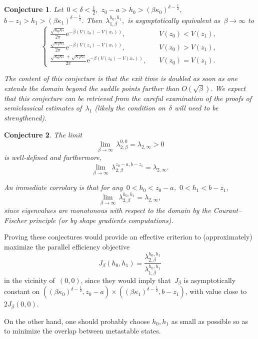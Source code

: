 \documentclass{article}
\newcommand{\e}{\mathrm{e}}
\newtheorem{conjecture}{Conjecture}
\begin{document}
    \begin{conjecture}\label{conj:lambda1}
        Let~$0<\delta<\frac12$,~$ z_0-a > h_0 > (\beta\kappa_0)^{\delta-\frac12}$,~$b-z_1>h_1>(\beta\kappa_1)^{\delta-\frac12}$.
         Then~$\lambda_{1,\beta}^{h_0,h_1},$ is asymptotically equivalent as~$\beta\to\infty$ to
        \begin{equation}
            \left\{
                \begin{aligned}
                    \frac{\sqrt{\kappa_0\kappa_*}}{2\pi}\e^{-\beta(V(z_0)-V(x_*))},&\quad V(z_0) < V(z_1),\\
                    \frac{\sqrt{\kappa_1\kappa_*}}{2\pi}\e^{-\beta(V(z_1)-V(x_*))},&\quad V(z_0) > V(z_1),\\
                    \frac{\sqrt{\kappa_0\kappa_*}+\sqrt{\kappa_1\kappa_*}}{2\pi}\e^{-\beta(V(z_0)-V(x_*))},& \quad V(z_0) = V(z_1).
                \end{aligned}
            \right.
        \end{equation}
    
    The content of this conjecture is that the exit time is doubled as soon as one extends the domain beyond the saddle points further than $O(\sqrt \beta)$. 
    We expect that this conjecture can be retrieved from the careful examination of the proofs of semiclassical estimates of~$\lambda_1$ (likely the condition on~$\delta$ will need to be strengthened).
    \end{conjecture}

    \begin{conjecture}\label{conj:lambda2}
        The limit
        \[\underset{\beta \to \infty}{\lim}\, \lambda_{2,\beta}^{0,0} = \lambda_{2,\infty} > 0\]
        is well-defined and furthermore,
        \[\underset{\beta \to \infty}{\lim}\, \lambda_{2,\beta}^{z_0-a,b-z_1}  = \lambda_{2,\infty}.\]

        An immediate corrolary is that for any~$0 < h_0 < z_0 -a$,~$0<h_1<b-z_1$,
        \[\underset{\beta \to \infty}{\lim}\, \lambda_{2,\beta}^{h_0,h_1}  = \lambda_{2,\infty},\]
        since eigenvalues are monotonous with respect to the domain by the Courant--Fischer principle (or by shape gradients computations).
    \end{conjecture}

    Proving these conjectures would provide an effective criterion to (approximately) maximize the parallel efficiency objective
    \[ J_{\beta}(h_0,h_1) = \frac{\lambda_{2,\beta}^{h_0,h_1}}{\lambda_{1,\beta}^{h_0,h_1}}\]
    in the vicinity of~$(0,0)$, since they would imply that~$J_\beta$ is asymptotically constant on $((\beta\kappa_0)^{\delta-\frac12},z_0-a)\times((\beta\kappa_1)^{\delta-\frac12},b-z_1)$, with value close to $2J_\beta(0,0)$.
    
    On the other hand, one should probably choose $h_0,h_1$ as small as possible so as to minimize the overlap between metastable states.
\end{document}
